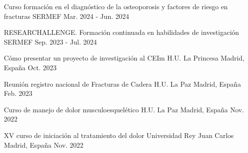 \begin{cventries}
  \cventry
    {Curso formación en el diagnóstico de la osteoporosis y factores de riesgo en fracturas} %
    {SERMEF} %
    {} %
    {Mar. 2024 - Jun. 2024} %
    {}

  \cventry
    {RESEARCHALLENGE. Formación continuada en habilidades de investigación} %
    {SERMEF} %
    {} %
    {Sep. 2023 - Jul. 2024} %
    {}

  \cventry
    {Cómo presentar un proyecto de investigación al CEIm} %
    {H.U. La Princesa} %
    {Madrid, España} %
    {Oct. 2023} %
    {}

  \cventry
    {Reunión registro nacional de Fracturas de Cadera} %
    {H.U. La Paz} %
    {Madrid, España} %
    {Feb. 2023} %
    {}

  \cventry
    {Curso de manejo de dolor musculoesquelético} %
    {H.U. La Paz} %
    {Madrid, España} %
    {Nov. 2022} %
    {}

  \cventry
    {XV curso de iniciación al tratamiento del dolor} %
    {Universidad Rey Juan Carlos} %
    {Madrid, España} %
    {Nov. 2022} %
    {}

\end{cventries}
